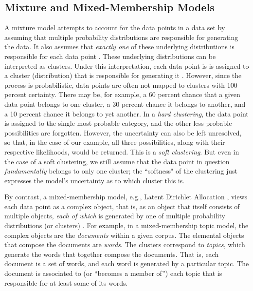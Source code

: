 \subsection{Mixture and Mixed-Membership Models}
\label{sec:mixture-models}
A mixture model attempts to account for the data points in a data set 
by assuming that multiple probability
distributions are responsible for generating the data. 
It also assumes that \emph{exactly one}
of these underlying distributions is responsible for each data point \citep{bishop:2006}. 
 These underlying 
distributions can be interpreted as clusters. Under this interpretation, each data point is 
is assigned to a cluster (distribution) that is responsible for 
generating it \citep{fraley:1998}. 
However, since the process is probabilistic,
data points are often not mapped to clusters with 100 percent certainty. 
There may be, for example, a 60 percent chance that a given data point belongs to one 
cluster, a 30 percent chance it belongs to another, and a 10 percent chance 
it belongs to yet another. In a \emph{hard clustering}, the data point is 
assigned to the single most probable category, and the other less probable 
possibilities are forgotten. However, the uncertainty can also be left 
unresolved, so that, in the case of our example, all three possibilities, 
along with their respective likelihoods, would be returned. This is a 
\emph{soft clustering}. But even in the case of a soft clustering, 
we still assume that the data point in question \emph{fundamentally} 
belongs to only one cluster; 
the ``softness" of the clustering just expresses the model's uncertainty 
as to which cluster this is. %

By contrast, a mixed-membership model, e.g., Latent Dirichlet Allocation \citep{blei-et-al:2003},
views each data point as a complex object, that is, as an object that itself consists of multiple objects, 
\emph{each of which} is generated by one of multiple probability distributions (or clusters) \citep{airoldi-et-al:2014}. 
For example, in a mixed-membership topic model, the complex objects are the 
\emph{documents} within a given corpus. The elemental objects that compose 
the documents are \emph{words}. The clusters correspond to \emph{topics}, which generate 
the words that together compose the documents. That is, each document is a set of words, and each 
word is generated by a particular topic. The document is associated to 
(or ``becomes a member of'') each topic that is
responsible for at least some of its words. 

